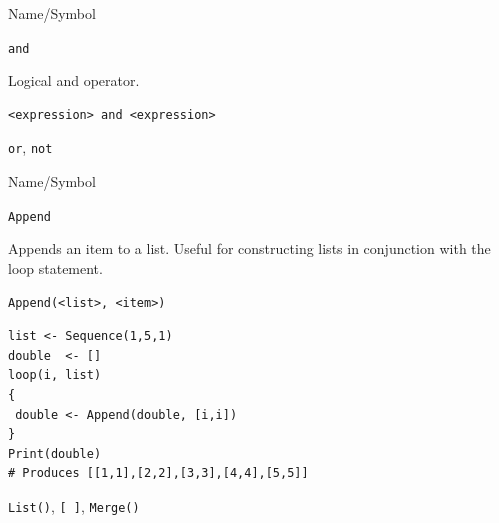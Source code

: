 \begin{desc}{Name/Symbol}
\item[Name/Symbol]  	\verb+and+
  
\item[Description]  	Logical and operator.

\item[Usage]       	
\begin{verbatim}
<expression> and <expression>
\end{verbatim}

\item[Example]	

\item[See Also]     	\verb+or+, \verb+not+

\end{desc}




\begin{desc}{Name/Symbol}

\item[Name/Symbol]  	\verb+Append+
  
\item[Description]  	Appends an item to a list.  Useful for constructing lists in conjunction with the loop statement.

\item[Usage] 
\begin{verbatim}
Append(<list>, <item>)
\end{verbatim}

\item[Example]
\begin{verbatim}
list <- Sequence(1,5,1)
double  <- []
loop(i, list)
{
 double <- Append(double, [i,i])
}
Print(double)
# Produces [[1,1],[2,2],[3,3],[4,4],[5,5]]
\end{verbatim}

\item[See Also]     	\verb+List()+, \verb+[ ]+, \verb+Merge()+
\end{desc}



